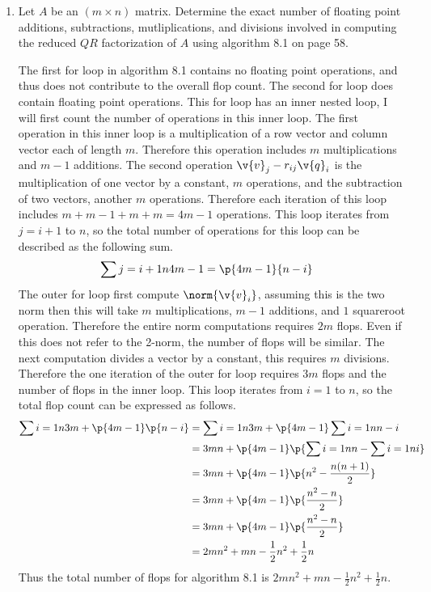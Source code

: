 \documentclass[11pt]{article}
\begin{document}
\begin{enumerate}
\begin{enumerate}
        \end{enumerate}

    \item %
        Let $A$ be an $(m \times n)$ matrix.
        Determine the exact number of floating point additions, subtractions,
        mutliplications, and divisions involved in computing the reduced $QR$
        factorization of $A$ using algorithm 8.1 on page 58.

        The first for loop in algorithm 8.1 contains no floating point
        operations, and thus does not contribute to the overall flop count.
        The second for loop does contain floating point operations.
        This for loop has an inner nested loop, I will first count the
        number of operations in this inner loop.
        The first operation in this inner loop is a multiplication of a row
        vector and column vector each of length $m$.
        Therefore this operation includes $m$ multiplications and $m-1$
        additions.
        The second operation $\v{v}_j - r_{ij} \v{q}_i$ is the multiplication
        of one vector by a constant, $m$ operations, and the subtraction of
        two vectors, another $m$ operations.
        Therefore each iteration of this loop includes
        $m + m - 1 + m + m = 4m - 1$ operations.
        This loop iterates from $j = i + 1$ to $n$, so the total number of
        operations for this loop can be described as the following sum.
        \begin{align*}
            \sum{j = i+1}{n}{4m - 1} &= \p{4m - 1}{n - i}
        \end{align*}
        The outer for loop first compute $\norm{\v{v}_i}$, assuming this is
        the two norm then this will take $m$ multiplications, $m - 1$ additions,
        and $1$ squareroot operation.
        Therefore the entire norm computations requires $2m$ flops.
        Even if this does not refer to the 2-norm, the number of flops will be
        similar.
        The next computation divides a vector by a constant, this requires $m$
        divisions.
        Therefore the one iteration of the outer for loop requires $3m$ flops
        and the number of flops in the inner loop.
        This loop iterates from $i = 1$ to $n$, so the total flop count can be
        expressed as follows.
        \begin{align*}
            \sum{i = 1}{n}{3m + \p{4m - 1}\p{n-i}} &= \sum{i = 1}{n}{3m} + \p{4m-1}\sum{i=1}{n}{n-i} \\
            &= 3mn + \p{4m - 1}\p{\sum{i=1}{n}{n} - \sum{i=1}{n}{i}} \\
            &= 3mn + \p{4m - 1}\p{n^2 - \frac{n(n+1)}{2}} \\
            &= 3mn + \p{4m - 1}\p{\frac{n^2-n}{2}} \\
            &= 3mn + \p{4m - 1}\p{\frac{n^2-n}{2}} \\
            &= 2mn^2 + mn - \frac{1}{2}n^2 + \frac{1}{2}n
        \end{align*}
        Thus the total number of flops for algorithm 8.1 is
        $2mn^2 + mn - \frac{1}{2}n^2 + \frac{1}{2}n$.


\end{enumerate}
\end{document}
